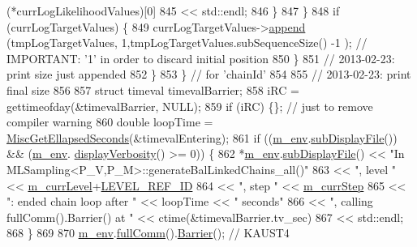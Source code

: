 \begin{DoxyCode}
      (*currLogLikelihoodValues)[0]
845                                   << std::endl;
846         \}
847       \}
848       \textcolor{keywordflow}{if} (currLogTargetValues) \{
849         currLogTargetValues->\hyperlink{class_q_u_e_s_o_1_1_scalar_sequence_a75cdd556cc417e35a6b9f7aff86896ae}{append}    (tmpLogTargetValues,    1,tmpLogTargetValues.subSequenceSize()
      -1    ); \textcolor{comment}{// IMPORTANT: '1' in order to discard initial position}
850       \}
851       \textcolor{comment}{// 2013-02-23: print size just appended}
852     \}
853   \} \textcolor{comment}{// for 'chainId'}
854 
855   \textcolor{comment}{// 2013-02-23: print final size}
856 
857   \textcolor{keyword}{struct }timeval timevalBarrier;
858   iRC = gettimeofday(&timevalBarrier, NULL);
859   \textcolor{keywordflow}{if} (iRC) \{\}; \textcolor{comment}{// just to remove compiler warning}
860   \textcolor{keywordtype}{double} loopTime = \hyperlink{namespace_q_u_e_s_o_a424bc33f2e6e287fd468408d14b772ee}{MiscGetEllapsedSeconds}(&timevalEntering);
861   \textcolor{keywordflow}{if} ((\hyperlink{class_q_u_e_s_o_1_1_m_l_sampling_a13f1ca4fe9f94822fe572a743eaced1d}{m\_env}.\hyperlink{class_q_u_e_s_o_1_1_base_environment_a8a0064746ae8dddfece4229b9ad374d6}{subDisplayFile}()) && (\hyperlink{class_q_u_e_s_o_1_1_m_l_sampling_a13f1ca4fe9f94822fe572a743eaced1d}{m\_env}.
      \hyperlink{class_q_u_e_s_o_1_1_base_environment_a1fe5f244fc0316a0ab3e37463f108b96}{displayVerbosity}() >= 0)) \{
862     *\hyperlink{class_q_u_e_s_o_1_1_m_l_sampling_a13f1ca4fe9f94822fe572a743eaced1d}{m\_env}.\hyperlink{class_q_u_e_s_o_1_1_base_environment_a8a0064746ae8dddfece4229b9ad374d6}{subDisplayFile}() << \textcolor{stringliteral}{"In MLSampling<P\_V,P\_M>::generateBalLinkedChains\_all()"}
863                             << \textcolor{stringliteral}{", level "} << \hyperlink{class_q_u_e_s_o_1_1_m_l_sampling_af9416874c856e50f3b35270e801f17e4}{m\_currLevel}+\hyperlink{_m_l_sampling_level_options_8h_a68d15eaf394d210effcf584b938206d3}{LEVEL\_REF\_ID}
864                             << \textcolor{stringliteral}{", step "}  << \hyperlink{class_q_u_e_s_o_1_1_m_l_sampling_a1b1f8ccb4823bdfa26ec652f0807c63e}{m\_currStep}
865                             << \textcolor{stringliteral}{": ended chain loop after "} << loopTime << \textcolor{stringliteral}{" seconds"}
866                             << \textcolor{stringliteral}{", calling fullComm().Barrier() at "} << ctime(&timevalBarrier.tv\_sec)
867                             << std::endl;
868   \}
869 
870   \hyperlink{class_q_u_e_s_o_1_1_m_l_sampling_a13f1ca4fe9f94822fe572a743eaced1d}{m\_env}.\hyperlink{class_q_u_e_s_o_1_1_base_environment_a0b0779b41ff304058856e97e1d16b4d4}{fullComm}().\hyperlink{class_q_u_e_s_o_1_1_mpi_comm_a4059971c30e023b272fccaa6aa00c426}{Barrier}(); \textcolor{comment}{// KAUST4}

\end{DoxyCode}
